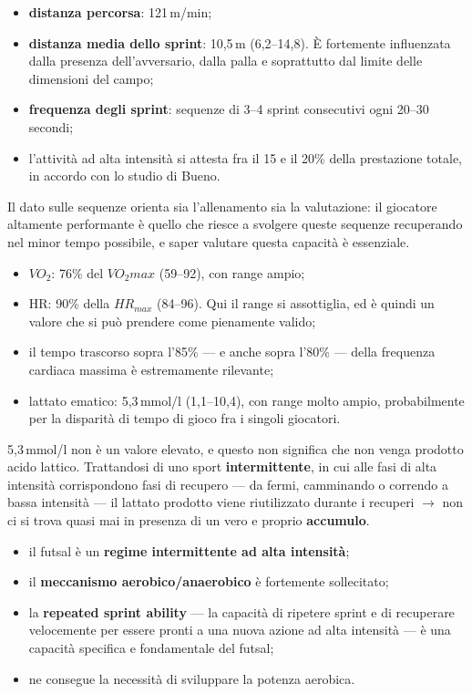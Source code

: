 \begin{itemize}
  \item \textbf{distanza percorsa}: 121\,m/min;
  \item \textbf{distanza media dello sprint}: 10,5\,m (6,2--14,8). È fortemente influenzata dalla
    presenza dell'avversario, dalla palla e soprattutto dal limite delle dimensioni del campo;
  \item \textbf{frequenza degli sprint}: sequenze di 3--4 sprint consecutivi ogni 20--30 secondi;
  \item l'attività ad alta intensità si attesta fra il 15 e il 20\% della prestazione totale, in
    accordo con lo studio di Bueno.
\end{itemize}
Il dato sulle sequenze orienta sia l'allenamento sia la valutazione: il giocatore altamente
performante è quello che riesce a svolgere queste sequenze recuperando nel minor tempo possibile, e
saper valutare questa capacità è essenziale.

\begin{itemize}
  \item $VO_2$: 76\% del $VO_{2}max$ (59--92), con range ampio;
  \item HR: 90\% della $HR_{max}$ (84--96). Qui il range si assottiglia, ed è quindi un valore che
    si può prendere come pienamente valido;
  \item il tempo trascorso sopra l'85\% --- e anche sopra l'80\% --- della frequenza cardiaca
    massima è estremamente rilevante;
  \item lattato ematico: 5,3\,mmol/l (1,1--10,4), con range molto ampio, probabilmente per la
    disparità di tempo di gioco fra i singoli giocatori.
\end{itemize}

5,3\,mmol/l non è un valore elevato, e questo non significa che non venga prodotto acido lattico.
Trattandosi di uno sport \textbf{intermittente}, in cui alle fasi di alta intensità corrispondono
fasi di recupero --- da fermi, camminando o correndo a bassa intensità --- il lattato prodotto viene
riutilizzato durante i recuperi $\rightarrow$ non ci si trova quasi mai in presenza di un vero e
proprio \textbf{accumulo}.

\begin{itemize}
  \item il futsal è un \textbf{regime intermittente ad alta intensità};
  \item il \textbf{meccanismo aerobico/anaerobico} è fortemente sollecitato;
  \item la \textbf{repeated sprint ability} --- la capacità di ripetere sprint e di recuperare
    velocemente per essere pronti a una nuova azione ad alta intensità --- è una capacità specifica
    e fondamentale del futsal;
  \item ne consegue la necessità di sviluppare la potenza aerobica.
\end{itemize}

